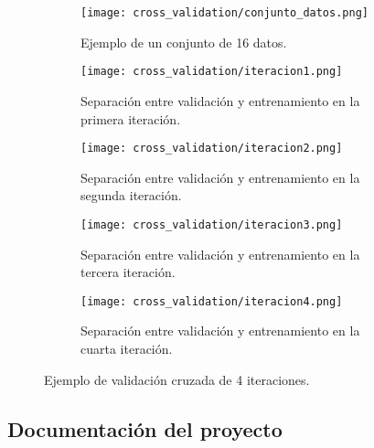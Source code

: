 \begin{figure}[H]
    \centering

	 \begin{subfigure}[b]{\textwidth}
		\centering
		\texttt{[image: cross\_validation/conjunto\_datos.png]}
		\caption{Ejemplo de un conjunto de 16 datos.}
	  \label{fig:ej_16_datos}
   \end{subfigure}
	\vspace{1cm}

	 \begin{subfigure}[b]{\textwidth}
		 \centering
		 \texttt{[image: cross\_validation/iteracion1.png]}
 		 \caption{Separación entre validación y entrenamiento en la primera iteración.}
 	    \label{fig:cv_iteracion1}
	 \end{subfigure}
	 \vspace{1cm}

	\begin{subfigure}[b]{\textwidth}
		 \centering
		 \texttt{[image: cross\_validation/iteracion2.png]}
 		 \caption{Separación entre validación y entrenamiento en la segunda iteración.}
 	    \label{fig:cv_iteracion2}
   \end{subfigure}
	\vspace{1cm}

	\begin{subfigure}[b]{\textwidth}
		 \centering
		 \texttt{[image: cross\_validation/iteracion3.png]}
 		 \caption{Separación entre validación y entrenamiento en la tercera iteración.}
 	    \label{fig:cv_iteracion3}
	\end{subfigure}
	\vspace{1cm}

	\begin{subfigure}[b]{\textwidth}
		 \centering
		 \texttt{[image: cross\_validation/iteracion4.png]}
 		 \caption{Separación entre validación y entrenamiento en la cuarta iteración.}
 	    \label{fig:cv_iteracion4}
	\end{subfigure}

	\caption{Ejemplo de validación cruzada de 4 iteraciones.}
	\label{fig:4-cv-ejemplo}
\end{figure}

\newpage

\subsection{Documentación del proyecto}

